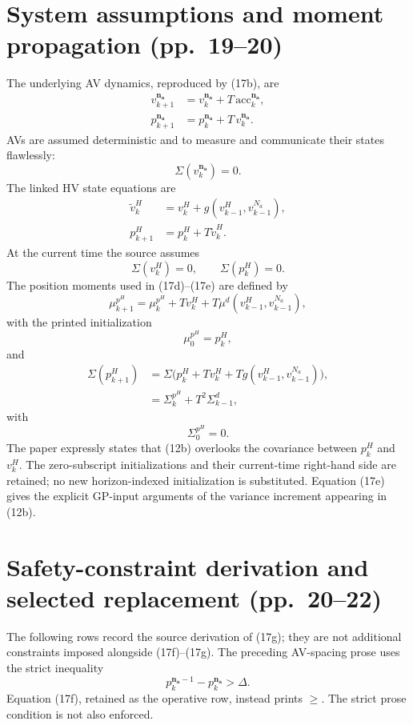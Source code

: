 \documentclass{article}
\begin{document}
\section*{System assumptions and moment propagation (pp.\ 19--20)}
The underlying AV dynamics, reproduced by (17b), are
\begin{align}
v_{k+1}^{\mathbf{n_a}}&=v_k^{\mathbf{n_a}}+T\,\mathrm{acc}_k^{\mathbf{n_a}},\tag{9a}\\
p_{k+1}^{\mathbf{n_a}}&=p_k^{\mathbf{n_a}}+T\,v_k^{\mathbf{n_a}}.\tag{9b}
\end{align}
AVs are assumed deterministic and to measure and communicate their states flawlessly:
\[
\Sigma(v_k^{\mathbf{n_a}})=0.
\]
The linked HV state equations are
\begin{align}
\widetilde v_k^H&=v_k^H+g(v_{k-1}^H,v_{k-1}^{N_a}),\tag{10a}\\
p_{k+1}^H&=p_k^H+T\widetilde v_k^H.\tag{10b}
\end{align}
At the current time the source assumes
\[
\Sigma(v_k^H)=0,\qquad \Sigma(p_k^H)=0.
\]
The position moments used in (17d)--(17e) are defined by
\begin{equation}
\mu_{k+1}^{p^H}=\mu_k^{p^H}+Tv_k^H
 +T\mu^d(v_{k-1}^H,v_{k-1}^{N_a}),\tag{11}
\end{equation}
with the printed initialization
\[
\mu_0^{p^H}=p_k^H,
\]
and
\begin{align}
\Sigma(p_{k+1}^H)
 &=\Sigma\bigl(p_k^H+Tv_k^H+Tg(v_{k-1}^H,v_{k-1}^{N_a})\bigr),\tag{12a}\\
 &=\Sigma_k^{p^H}+T^2\Sigma_{k-1}^d,\tag{12b}
\end{align}
with
\[
\Sigma_0^{p^H}=0.
\]
The paper expressly states that (12b) overlooks the covariance between $p_k^H$ and $v_k^H$. The zero-subscript initializations and their current-time right-hand side are retained; no new horizon-indexed initialization is substituted. Equation (17e) gives the explicit GP-input arguments of the variance increment appearing in (12b).

\section*{Safety-constraint derivation and selected replacement (pp.\ 20--22)}
The following rows record the source derivation of (17g); they are not additional constraints imposed alongside (17f)--(17g). The preceding AV-spacing prose uses the strict inequality
\[
p_k^{\mathbf{n_a}-1}-p_k^{\mathbf{n_a}}>\Delta.
\]
Equation (17f), retained as the operative row, instead prints $\geq$. The strict prose condition is not also enforced.
\end{document}
